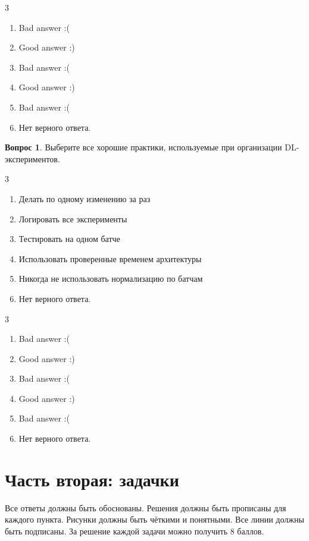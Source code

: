 \documentclass[12pt]{article}
\newenvironment{answerlist}[1][3]{
\begin{multicols}{#1}

\begin{enumerate}[label=\fbox{\emph{\Alph*}},ref=\emph{\alph*}]
}
{
\item Нет верного ответа.
\end{enumerate}
\end{multicols}
}
\theoremstyle{definition}
\newtheorem{question}{Вопрос}
\begin{document}
\begin{solution}
\begin{answerlist}
  \item Bad answer :(
  \item Good answer :)
  \item Bad answer :(
  \item Good answer :)
  \item Bad answer :(
\end{answerlist}
\end{solution}
 
\begin{question}
Выберите все хорошие практики, используемые при организации DL-экспериментов.
\begin{answerlist}
  \item Делать по одному изменению за раз
  \item Логировать все эксперименты
  \item Тестировать на одном батче
  \item Использовать проверенные временем архитектуры
  \item Никогда не использовать нормализацию по батчам
\end{answerlist}
\end{question}

\begin{solution}
\begin{answerlist}
  \item Bad answer :(
  \item Good answer :)
  \item Bad answer :(
  \item Good answer :)
  \item Bad answer :(
\end{answerlist}
\end{solution}
 
 
 
\newpage 

\section*{Часть вторая: задачки}

Все ответы должны быть обоснованы. Решения должны быть прописаны для каждого пункта. Рисунки должны быть чёткими и понятными. Все линии должны быть подписаны. За решение каждой задачи можно получить $8$ баллов.
\end{document}
